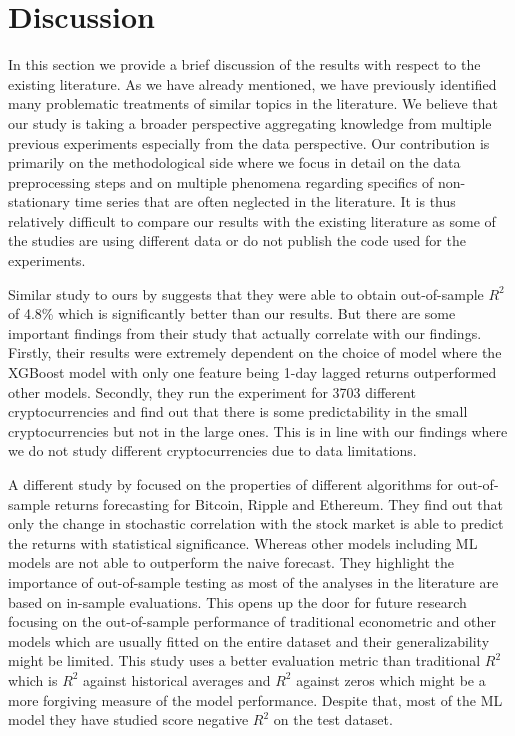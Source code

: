 \section{Discussion}
\label{sec:discussion}

In this section we provide a brief discussion
of the results with respect to the existing literature.
As we have already mentioned, we have previously
identified many problematic treatments of 
similar topics in the literature. We believe
that our study is taking a broader 
perspective aggregating knowledge
from multiple previous experiments especially from the data perspective. 
Our contribution is primarily on the 
methodological side where we focus 
in detail on the data preprocessing steps and 
on multiple phenomena regarding specifics
of non-stationary time series that are often neglected in the literature.
It is thus relatively difficult to compare our results with
the existing literature as 
some of the studies are using different data
or do not publish the code used for the experiments.

Similar study to ours by 
\cite{Liu2023} suggests
that they were able to obtain out-of-sample $R^2$  of 4.8\%
which is significantly better than our results.
But there are some important findings from their study
that actually correlate with our findings.
Firstly, their results were extremely 
dependent on the choice of model where the XGBoost model
with only one feature being 1-day lagged returns outperformed 
other models. 
Secondly, they run the experiment
for 3703 different cryptocurrencies and find out 
that there is some predictability in the small
cryptocurrencies but not in the large ones. This
is in line with our findings where
we do not study different cryptocurrencies due to data limitations.


A different study by
\cite{Yae2022} focused on the properties
of different algorithms for out-of-sample returns forecasting
for Bitcoin, Ripple and Ethereum. 
They find out that only the change in stochastic correlation with the stock
market is able to predict the returns with statistical significance.
Whereas other models including \ac{ML} models 
are not able to outperform the naive forecast. 
They highlight the importance of out-of-sample testing
as most of the analyses in the literature are based on in-sample evaluations.
This opens up the door for future research focusing
on the out-of-sample performance of traditional econometric and other models
which are usually fitted on the entire dataset and their generalizability 
might be limited. This study 
uses a better evaluation metric than traditional $R^2$ 
which is $R^2$ against historical averages and $R^2$ against zeros
which might be a more forgiving measure of the model performance.
Despite that, 
most of the \ac{ML} model they have studied score negative $R^2$ on 
the test dataset.

